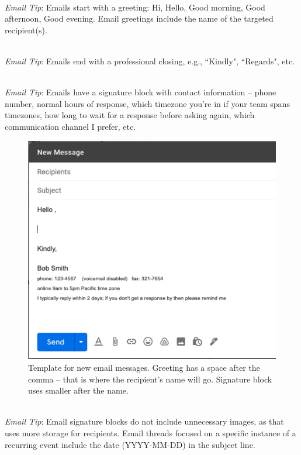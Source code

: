 \ \\
\textit{Email Tip}: Emails start with a greeting: Hi, Hello, Good morning, Good afternoon, Good evening. 
Email greetings include the name of the targeted recipient(s). 

\ \\
\textit{Email Tip}: Emails end with a professional closing, e.g., ``Kindly", ``Regards", etc.

\ \\
\textit{Email Tip}: Emails have a signature block with contact information -- phone number, normal hours of response, which timezone you're in if your team spans timezones, how long to wait for a response before asking again, which communication channel I prefer, etc.

\begin{figure}
\includegraphics[width=1\textwidth]{images/email_template.pdf}
\caption{Template for new email messages. Greeting has a space after the comma -- that is where the recipient's name will go. Signature block uses smaller after the name.}
\label{fig:email_template}
\end{figure}

\ \\
\textit{Email Tip}: Email signature blocks do not include unnecessary images, as that uses more storage for recipients. 
Email threads focused on a specific instance of a recurring event include the date (YYYY-MM-DD) in the subject line. 

